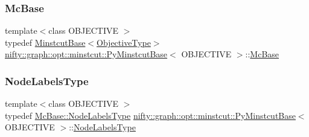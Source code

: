 \mbox{\label{classnifty_1_1graph_1_1opt_1_1minstcut_1_1PyMinstcutBase_a47c2cf30fc07e8ba8b9c9f9a9b6d8e84}} 
\subsubsection{\texorpdfstring{Mc\+Base}{McBase}}
{\footnotesize\ttfamily template$<$class O\+B\+J\+E\+C\+T\+I\+VE $>$ \\
typedef \hyperlink{classnifty_1_1graph_1_1opt_1_1minstcut_1_1MinstcutBase}{Minstcut\+Base}$<$\hyperlink{classnifty_1_1graph_1_1opt_1_1minstcut_1_1PyMinstcutBase_acadf3b778a5c31979914063a2603223c}{Objective\+Type}$>$ \hyperlink{classnifty_1_1graph_1_1opt_1_1minstcut_1_1PyMinstcutBase}{nifty\+::graph\+::opt\+::minstcut\+::\+Py\+Minstcut\+Base}$<$ O\+B\+J\+E\+C\+T\+I\+VE $>$\+::\hyperlink{classnifty_1_1graph_1_1opt_1_1minstcut_1_1PyMinstcutBase_a47c2cf30fc07e8ba8b9c9f9a9b6d8e84}{Mc\+Base}}

\mbox{\label{classnifty_1_1graph_1_1opt_1_1minstcut_1_1PyMinstcutBase_a9bec148d1b9938c8bb61fc079addda6f}} 
\subsubsection{\texorpdfstring{Node\+Labels\+Type}{NodeLabelsType}}
{\footnotesize\ttfamily template$<$class O\+B\+J\+E\+C\+T\+I\+VE $>$ \\
typedef \hyperlink{classnifty_1_1graph_1_1opt_1_1common_1_1SolverBase_abefd51561de2fd009f6bed6bef6009ea}{Mc\+Base\+::\+Node\+Labels\+Type} \hyperlink{classnifty_1_1graph_1_1opt_1_1minstcut_1_1PyMinstcutBase}{nifty\+::graph\+::opt\+::minstcut\+::\+Py\+Minstcut\+Base}$<$ O\+B\+J\+E\+C\+T\+I\+VE $>$\+::\hyperlink{classnifty_1_1graph_1_1opt_1_1minstcut_1_1PyMinstcutBase_a9bec148d1b9938c8bb61fc079addda6f}{Node\+Labels\+Type}}

